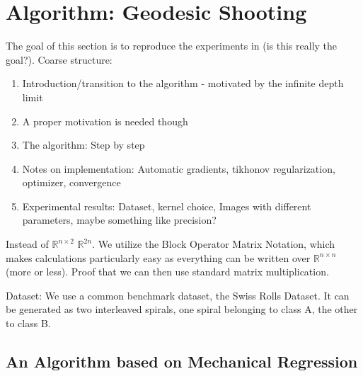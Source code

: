 \section{Algorithm: Geodesic Shooting}

The goal of this section is to reproduce the experiments in \cite{owhadi20} (is this really the goal?).
Coarse structure:
\begin{enumerate}
	\item Introduction/transition to the algorithm - motivated by the infinite depth limit
	\item A proper motivation is needed though
	\item The algorithm: Step by step
	\item Notes on implementation: Automatic gradients, tikhonov regularization, optimizer, convergence
	\item Experimental results: Dataset, kernel choice, Images with different parameters, maybe something like precision?
\end{enumerate}

Instead of $\mathbb{R}^{n\times2}$ $\mathbb{R}^{2n}$.
We utilize the Block Operator Matrix Notation, which makes calculations particularly easy as everything can be written over $\mathbb{R}^{n\times n}$ (more or less).
Proof that we can then use standard matrix multiplication.





Dataset: We use a common benchmark dataset, the Swiss Rolls Dataset.
It can be generated as two interleaved spirals, one spiral belonging to class A, the other to class B.

\subsection{An Algorithm based on Mechanical Regression}

